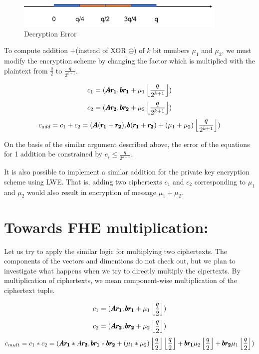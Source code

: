 \documentclass[usletter]{article}
\begin{document}
\begin{figure}[!htbp]
\begin{center}
\includegraphics[width=0.9\textwidth]{error.pdf}
\end{center}
\caption{Decryption Error}
\label{error}
\end{figure}

\begin{corollary}
To compute addition $ + $(instead of XOR $\oplus$) of $k$ bit numbers $\mu_1$ and $\mu_2$, we must modify the encryption scheme by changing the factor which is multiplied with the plaintext from $\frac{q}{2}$ to $\frac{q}{2^{k+1}}$.

$$c_1 = ( \pmb{Ar_1}, \pmb{br_1} + \mu_1\left\lfloor \frac{q}{2^{k+1}} \right\rfloor )$$
$$c_2 = ( \pmb{Ar_2}, \pmb{br_2} + \mu_2\left\lfloor \frac{q}{2^{k+1}} \right\rfloor )$$
$$c_{add} = c_1 + c_2 = ( \pmb{A}(\pmb{r_1} + \pmb{r_2}), \pmb{b}(\pmb{r_1} +\pmb{r_2}) + (\mu_1 + \mu_2)\left\lfloor \frac{q}{2^{k+1}} \right\rfloor )$$

On the basis of the similar argument described above, the error of the equations for 1 addition be 
constrained by $e_i \leq \frac{q}{2^{k+1}}$.
\end{corollary}
\begin{remark}
It is also possible to implement a similar addition for the private key encryption  scheme 
using LWE. That is, adding two ciphertexts $c_1$ and $c_2$ corresponding to $\mu_1$ and $\mu_2$
would also result in encryption of message $\mu_1 + \mu_2$.
\end{remark}

\section{Towards FHE multiplication:}
Let us try to apply the similar logic for multiplying two ciphertexts. The components of the vectors and dimentions do not check out, but we plan to investigate what happens when we try to directly multiply the cipertexts. By multiplication of ciphertexts, we mean component-wise multiplication of the ciphertext tuple. 

$$c_1 = ( \pmb{Ar_1}, \pmb{br_1} + \mu_1\left\lfloor \frac{q}{2} \right\rfloor )$$
$$c_2 = ( \pmb{Ar_2}, \pmb{br_2} + \mu_2\left\lfloor \frac{q}{2} \right\rfloor )$$
$$c_{mult} = c_1 * c_2 = ( \pmb{A}\pmb{r_1} * A \pmb{r_2}, \pmb{b}\pmb{r_1} *\pmb{b}\pmb{r_2} + (\mu_1 * \mu_2)\left\lfloor \frac{q}{2} \right\rfloor\left\lfloor \frac{q}{2} \right\rfloor + \pmb{br_1}\mu_2\left\lfloor \frac{q}{2} \right\rfloor + \pmb{br_2}\mu_1\left\lfloor \frac{q}{2} \right\rfloor )$$
\end{document}
